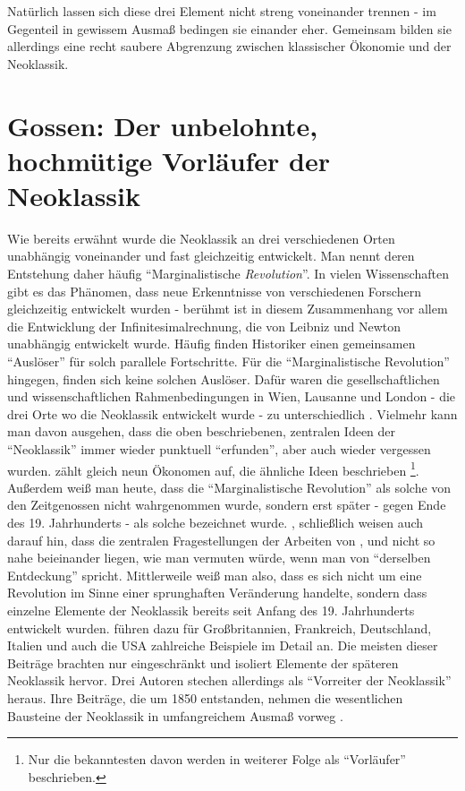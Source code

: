 Natürlich lassen sich diese drei Element nicht streng voneinander trennen - im Gegenteil in gewissem Ausmaß bedingen sie einander eher. Gemeinsam bilden sie allerdings eine recht saubere Abgrenzung zwischen klassischer Ökonomie und der Neoklassik.


\section{Gossen: Der unbelohnte, hochmütige Vorläufer der Neoklassik}
\label{Vorläufer}

Wie bereits erwähnt wurde die Neoklassik an drei verschiedenen Orten unabhängig voneinander und fast gleichzeitig entwickelt. Man nennt deren Entstehung daher häufig "`Marginalistische \textit{Revolution}"'. In vielen Wissenschaften gibt es das Phänomen, dass neue Erkenntnisse von verschiedenen Forschern gleichzeitig entwickelt wurden - berühmt ist in diesem Zusammenhang vor allem die Entwicklung der Infinitesimalrechnung, die von Leibniz und Newton unabhängig entwickelt wurde. Häufig finden Historiker einen gemeinsamen "`Auslöser"' für solch parallele Fortschritte. Für die "`Marginalistische Revolution"' hingegen, finden sich keine solchen Auslöser. Dafür waren die gesellschaftlichen und wissenschaftlichen Rahmenbedingungen in Wien, Lausanne und London - die drei Orte wo die Neoklassik entwickelt wurde - zu unterschiedlich \parencite[S. 269]{Blaug1973}. Vielmehr kann man davon ausgehen, dass die oben beschriebenen, zentralen Ideen der "`Neoklassik"' immer wieder punktuell "`erfunden"', aber auch wieder vergessen wurden. \textcite[S. 274]{Blaug1973} zählt gleich neun Ökonomen auf, die ähnliche Ideen beschrieben \footnote{Nur die bekanntesten davon werden in weiterer Folge als "`Vorläufer"' beschrieben.}. Außerdem weiß man heute, dass die "`Marginalistische Revolution"' als solche von den Zeitgenossen nicht wahrgenommen wurde, sondern erst später - gegen Ende des 19. Jahrhunderts - als solche bezeichnet wurde. \textcite[S. 338]{Hicks1934}, \textcite[S. 516]{Jaffe1976} schließlich weisen auch darauf hin, dass die zentralen Fragestellungen der Arbeiten von \textcite{Menger1871}, \textcite{Jevons1871} und \textcite{Walras1874} nicht so nahe beieinander liegen, wie man vermuten würde, wenn man von "`derselben Entdeckung"' spricht. Mittlerweile weiß man also, dass es sich nicht um eine Revolution im Sinne einer sprunghaften Veränderung handelte, sondern dass einzelne Elemente der Neoklassik bereits seit Anfang des 19. Jahrhunderts entwickelt wurden. \textcite{Ekelund2002} führen dazu für Großbritannien, Frankreich, Deutschland, Italien und auch die USA zahlreiche Beispiele im Detail an. Die meisten dieser Beiträge brachten nur eingeschränkt und isoliert Elemente der späteren Neoklassik hervor. Drei Autoren stechen allerdings als "`Vorreiter der Neoklassik"' heraus. Ihre Beiträge, die um 1850 entstanden, nehmen die wesentlichen Bausteine der Neoklassik in umfangreichem Ausmaß vorweg \parencite[S. 205]{Ekelund2002}. 

